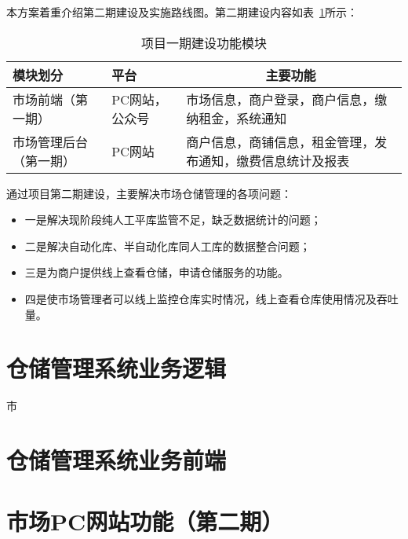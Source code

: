 \documentclass[12pt,a4paper,openany]{ctexrep}
\begin{document}
本方案着重介绍第二期建设及实施路线图。第二期建设内容如表~\ref{function}所示：

\begin{table}[htbp]
\begin{tabular*}{\hsize}{p{3cm}<{\centering}|p{3cm}<{\centering}|p{8cm}}
\hline
模块划分					&	平台				&	\multicolumn{1}{c}{主要功能}		\\
\hline
市场前端（第一期）		&	PC网站，公众号		&	市场信息，商户登录，商户信息，缴纳租金，系统通知		\\
\hline
市场管理后台（第一期）	&	PC网站				&	商户信息，商铺信息，租金管理，发布通知，缴费信息统计及报表		\\	
\hline
\end{tabular*}
\caption{项目一期建设功能模块}
\label{function}
\end{table}

通过项目第二期建设，主要解决市场仓储管理的各项问题：
\begin{itemize}
\item 一是解决现阶段纯人工平库监管不足，缺乏数据统计的问题；
\item 二是解决自动化库、半自动化库同人工库的数据整合问题；
\item 三是为商户提供线上查看仓储，申请仓储服务的功能。
\item 四是使市场管理者可以线上监控仓库实时情况，线上查看仓库使用情况及吞吐量。
\end{itemize}

\chapter{仓储管理系统业务逻辑}
\lettrine[lines=2]{市}\, 
\section{}

\chapter{仓储管理系统业务前端}
\section{}

\chapter{市场PC网站功能（第二期）}
\end{document}
